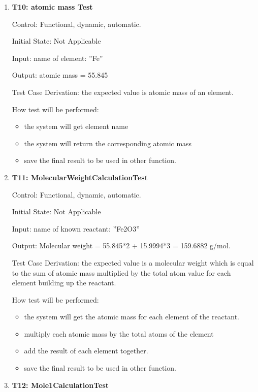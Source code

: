 \documentclass[12pt, titlepage]{article}
\begin{document}
\begin{enumerate}

\item{\bf T10: atomic mass Test\\}

Control: Functional, dynamic, automatic.
					
Initial State: Not Applicable
					
Input: name of element: ”Fe”
				
Output:  atomic mass = 55.845

Test Case Derivation: the expected value is atomic mass of an element.
					
How test will be performed: 
\begin{itemize}
\item the system will get element name
\item the system will return the corresponding atomic mass
\item save the final result to be used in other function.
\end{itemize}

\item{\bf T11: MolecularWeightCalculationTest\\}

Control: Functional, dynamic, automatic.
					
Initial State: Not Applicable
					
Input: name of known reactant: ”Fe2O3”
				
Output:  Molecular weight = 55.845*2 + 15.9994*3 =  159.6882 g/mol. 

Test Case Derivation: the expected value is a molecular weight which is equal to the sum of  atomic mass multiplied by the total atom value for each element building up the reactant. 
					
How test will be performed: 
\begin{itemize}
\item the system will get the atomic mass for each element of the reactant.
\item multiply each atomic mass by the total atoms of the element 
\item add the result of each element together.
\item save the final result to be used in other function.
\end{itemize}

\item{\bf T12: Mole1CalculationTest \\}


\end{enumerate}
\end{document}
